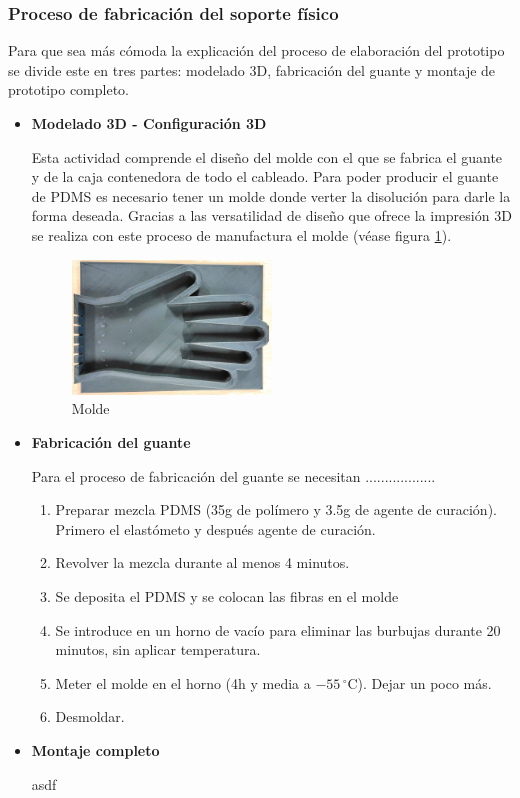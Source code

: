 \subsubsection{Proceso de fabricación del soporte físico}
Para que sea más cómoda la explicación del proceso de elaboración del prototipo se divide este en tres partes: modelado 3D, fabricación del guante y montaje de prototipo completo.

\begin{itemize}
	\item \textbf{Modelado 3D - Configuración 3D}
	
	Esta actividad comprende el diseño del molde con el que se fabrica el guante y de la caja contenedora de todo el cableado.
	Para poder producir el guante de PDMS es necesario tener un molde donde verter la disolución para darle la forma deseada. Gracias a las versatilidad de diseño que ofrece la impresión 3D se realiza con este proceso de manufactura el molde (véase figura \ref{fig:molde}). 
\begin{figure}[H]
	\centering
	\includegraphics[width=0.5\textwidth]{./img/molde1}
	\caption{Molde} \label{fig:molde}
\end{figure}

	
 
	\item \textbf{Fabricación del guante}
	
	Para el proceso de fabricación del guante se necesitan ..................
	
	\begin{enumerate}
		\item Preparar mezcla PDMS (35g de polímero y 3.5g de agente de curación). Primero el
		elastómeto y después agente de curación.
		\item Revolver la mezcla durante al menos 4 minutos.
		\item Se deposita el PDMS y se colocan las fibras en el molde
		\item Se introduce en un horno de vacío para eliminar las burbujas durante 20 minutos, sin aplicar
		temperatura.
		\item Meter el molde en el horno (4h y media a $-55\,^{\circ}\mathrm{C}$). Dejar un poco más.
		\item Desmoldar.

	\end{enumerate}
	
	
	\item \textbf{Montaje completo}
	
	asdf
	
\end{itemize}

